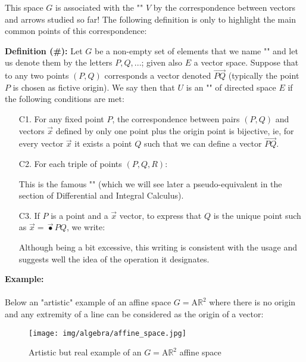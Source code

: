 	This space $G$ is associated with the "" $V$ by the correspondence between vectors and arrows studied so far! The following definition is only to highlight the main common points of this correspondence:
	
	\textbf{Definition (\#\mydef):} Let $G$ be a non-empty set of elements that we name "" and let us  denote them by the letters $P, Q, ...$; given also $E$ a vector space. Suppose that to any two points $(P, Q)$ corresponds a vector denoted $\overrightarrow{PQ}$ (typically the point $P$ is chosen as fictive origin). We say then that $U$ is an "" of directed space $E$ if the following conditions are met:
	\begin{enumerate}
		\item[C1.] For any fixed point $P$, the correspondence between pairs $(P, Q)$ and vectors $\vec{x}$ defined by only one point plus the origin point is bijective, ie, for every vector $\vec{x}$ it exists a point $Q$ such that we can define a vector $\overrightarrow{PQ}$.
		
		\item[C2.] For each triple of points $(P, Q, R)$:
		
		This is the famous "" (which we will see later a pseudo-equivalent in the section of Differential and Integral Calculus).
		
		\item[C3.] If $P$ is a point and a $\vec{x}$ vector, to express that $Q$ is the unique point such as $\vec{x}=\overrightarrow{•}{PQ}$, we write:
		
		Although being a bit excessive, this writing is consistent with the usage and suggests well the idea of the operation it designates.
	\end{enumerate}
	\begin{tcolorbox}[colframe=black,colback=white,sharp corners]
	\textbf{{\Large {}}Example:}\\\\
	Below an "artistic" example of an affine space $G=\text{A}\mathbb{R}^2$ where there is no origin and any extremity of a line can be considered as the origin of a vector:
	\begin{figure}[H]
		\centering
		\texttt{[image: img/algebra/affine\_space.jpg]}
		\caption{Artistic but real example of an $G=\text{A}\mathbb{R}^2$ affine space}
	\end{figure}
	\end{tcolorbox}
	

